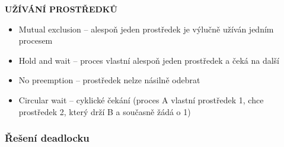 \documentclass[10pt,a4paper]{article}
\begin{document}
\textbf{UŽÍVÁNÍ PROSTŘEDKŮ}
\begin{itemize}
	\item Mutual exclusion – alespoň jeden prostředek je výlučně užíván jedním procesem
	\item Hold and wait – proces vlastní alespoň jeden prostředek a čeká na další
	\item No preemption – prostředek nelze násilně odebrat
	\item Circular wait – cyklické čekání (proces A vlastní prostředek 1, chce prostředek 2, který drží B a současně žádá o 1)
\end{itemize}

\subsubsection{Řešení deadlocku}
\end{document}
